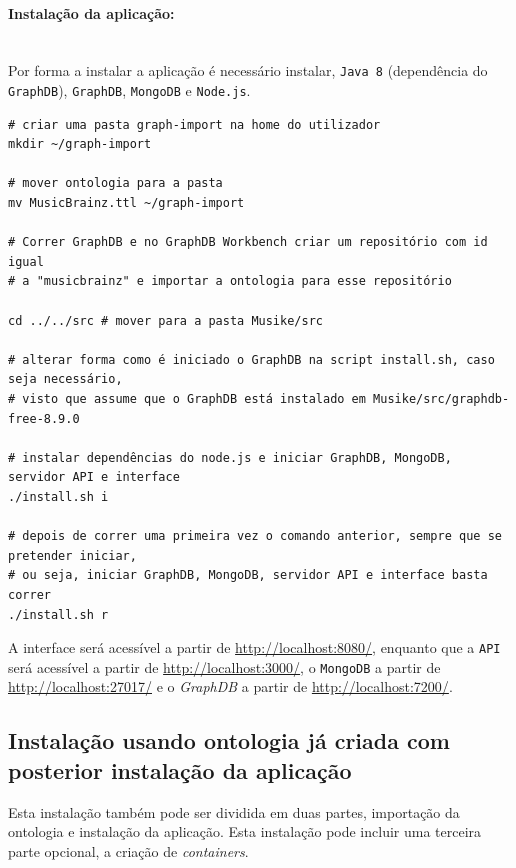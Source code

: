 \documentclass{article}
\begin{document}
\paragraph{Instalação da aplicação:}\mbox{}\\

Por forma a instalar a aplicação é necessário instalar, \texttt{Java 8} (dependência do \texttt{GraphDB}), \texttt{GraphDB}, \texttt{MongoDB} e \texttt{Node.js}.

\begin{framed}
\begin{verbatim}
# criar uma pasta graph-import na home do utilizador
mkdir ~/graph-import

# mover ontologia para a pasta
mv MusicBrainz.ttl ~/graph-import

# Correr GraphDB e no GraphDB Workbench criar um repositório com id igual 
# a "musicbrainz" e importar a ontologia para esse repositório

cd ../../src # mover para a pasta Musike/src

# alterar forma como é iniciado o GraphDB na script install.sh, caso seja necessário,
# visto que assume que o GraphDB está instalado em Musike/src/graphdb-free-8.9.0

# instalar dependências do node.js e iniciar GraphDB, MongoDB, servidor API e interface
./install.sh i

# depois de correr uma primeira vez o comando anterior, sempre que se pretender iniciar,
# ou seja, iniciar GraphDB, MongoDB, servidor API e interface basta correr
./install.sh r
\end{verbatim}
\end{framed}

A interface será acessível a partir de \url{http://localhost:8080/}, enquanto que a \texttt{API} será acessível a partir de \url{http://localhost:3000/}, o \texttt{MongoDB} a partir de \url{http://localhost:27017/} e o \textit{GraphDB} a partir de \url{http://localhost:7200/}.

\subsection{Instalação usando ontologia já criada com posterior instalação da aplicação}

Esta instalação também pode ser dividida em duas partes, importação da ontologia e instalação da aplicação. Esta instalação pode incluir uma terceira parte opcional, a criação de \textit{containers}.
\end{document}
